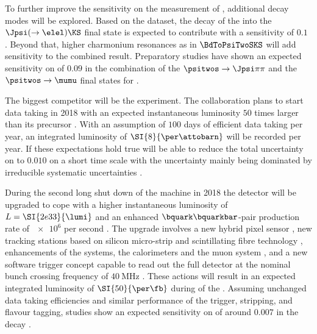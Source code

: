 To further improve the sensitivity on the measurement of \sintwobeta, additional
decay modes will be explored. Based on the \RunOne dataset, the decay of the \Bd
into the $\Jpsi (\to\elel) \KS$ final state is expected to contribute with a
sensitivity of $\num{0.1}$ \cite{bdtojpsieeks:ramon}. Beyond that, higher
charmonium resonances as in $\BdToPsiTwoSKS$ will add sensitivity to the
combined result. Preparatory studies have shown an expected sensitivity on
\sintwobeta of $\num{0.09}$ in the combination of the $\psitwos\to\Jpsi\pi\pi$
and the $\psitwos\to\mumu$ final states for \RunOne \cite{Mueller:2014}.

The biggest \LHCb competitor will be the \BelleTwo experiment. The collaboration
plans to start data taking in 2018 with an expected instantaneous luminosity
$\num{50}$ times larger than its precursor \Belle. With an assumption of
$\num{100}$ days of efficient data taking per year, an integrated luminosity of
$\SI{8}{\per\attobarn}$ will be recorded per year. If these expectations hold
true \BelleTwo will be able to reduce the total uncertainty on \sintwobeta to
$\num{0.010}$ on a short time scale with the uncertainty mainly being dominated
by irreducible systematic uncertainties \cite{Aushev:2010bq}.

During the second long shut down of the \LHC machine in 2018 the \LHCb detector
will be upgraded to cope with a higher instantaneous luminosity of $L =
\SI{2e33}{\lumi}$ and an enhanced $\bquark\bquarkbar$-pair production rate of
$\num{e6}$ per second \cite{Bediaga:1443882}. The upgrade involves a new hybrid
pixel sensor \VELO \cite{TDRVELO}, new tracking stations based on silicon
micro-strip and scintillating fibre technology \cite{TDRTracking}, enhancements
of the \RICH systems, the calorimeters and the muon system \cite{TDRPID}, and a
new software trigger concept capable to read out the full detector at the
nominal bunch crossing frequency of $\SI{40}{\mega\hertz}$ \cite{TDRTrigger}.
These actions will result in an expected integrated luminosity of
$\SI{50}{\per\fb}$ during \RunThree of the \LHC. Assuming unchanged data taking
efficiencies and similar performance of the trigger, stripping, and flavour
tagging, \ToyMC studies show an expected sensitivity on \sintwobeta of around
$\num{0.007}$ \cite{Moedden:2015} in the decay \BdToJpsiKS.
